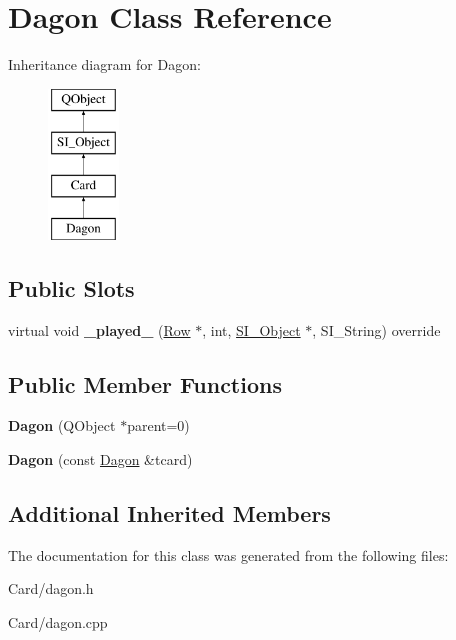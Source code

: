 \hypertarget{class_dagon}{}\section{Dagon Class Reference}
\label{class_dagon}
Inheritance diagram for Dagon\+:\begin{figure}[H]
\begin{center}
\leavevmode
\includegraphics[height=4.000000cm]{class_dagon}
\end{center}
\end{figure}
\subsection*{Public Slots}
\begin{DoxyCompactItemize}
\item 
\mbox{\label{class_dagon_a43007cf1938554e488596ecb0d99c5dc}} 
virtual void {\bfseries \+\_\+played\+\_\+} (\hyperlink{class_card_set}{Row} $\ast$, int, \hyperlink{class_s_i___object}{S\+I\+\_\+\+Object} $\ast$, S\+I\+\_\+\+String) override
\end{DoxyCompactItemize}
\subsection*{Public Member Functions}
\begin{DoxyCompactItemize}
\item 
\mbox{\label{class_dagon_afea78276d08292e6365e7d6e2715258b}} 
{\bfseries Dagon} (Q\+Object $\ast$parent=0)
\item 
\mbox{\label{class_dagon_ae7b3ff0df4754ce14b28f2426847a71e}} 
{\bfseries Dagon} (const \hyperlink{class_dagon}{Dagon} \&tcard)
\end{DoxyCompactItemize}
\subsection*{Additional Inherited Members}


The documentation for this class was generated from the following files\+:\begin{DoxyCompactItemize}
\item 
Card/dagon.\+h\item 
Card/dagon.\+cpp\end{DoxyCompactItemize}
